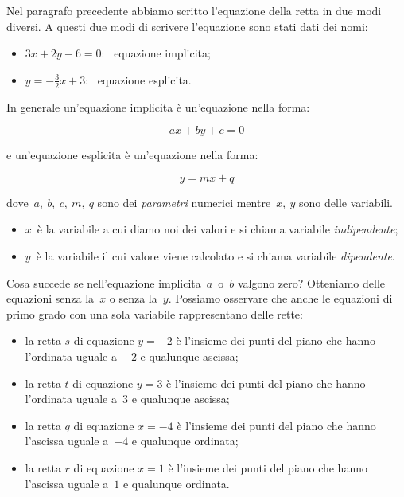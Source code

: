 Nel paragrafo precedente abbiamo scritto l'equazione della retta in due modi 
diversi. A questi due modi di scrivere l'equazione sono stati dati dei nomi:

\begin{itemize}
 \item $3x + 2y - 6 = 0$:~ equazione implicita;
 \item $y = -\frac{3}{2}x +3$:~ equazione esplicita.
\end{itemize}

In generale un'equazione implicita è un'equazione nella forma:

\[ax + by + c = 0\]

e un'equazione esplicita è un'equazione nella forma:

\[y = mx + q\]

dove~$a,~b,~c,~m,~q$ sono dei \emph{parametri} numerici mentre~$x,~y$ sono 
delle variabili.

\begin{itemize}
 \item $x$~è la variabile a cui diamo noi dei valori e si chiama 
  variabile \emph{indipendente};
 \item $y$~è la variabile il cui valore viene calcolato e si chiama 
  variabile \emph{dipendente}.
\end{itemize}

Cosa succede se nell'equazione implicita~$a$~o~$b$ valgono zero?
Otteniamo delle equazioni senza la~$x$ o senza la~$y$. 
Possiamo osservare che anche le equazioni di primo grado con una sola 
variabile rappresentano delle rette:

\begin{itemize}
 \item la retta $s$ di equazione $y=-2$ è l'insieme dei punti del piano 
  che hanno l'ordinata uguale a~$-2$ e qualunque ascissa;
 \item la retta $t$ di equazione $y=3$ è l'insieme dei punti del piano 
  che hanno l'ordinata uguale a~$3$ e qualunque ascissa;
 \item la retta $q$ di equazione $x=-4$ è l'insieme dei punti del piano 
  che hanno l'ascissa uguale a~$-4$ e qualunque ordinata;
 \item la retta $r$ di equazione $x=1$ è l'insieme dei punti del piano 
  che hanno l'ascissa uguale a~$1$ e qualunque ordinata.
\end{itemize}

